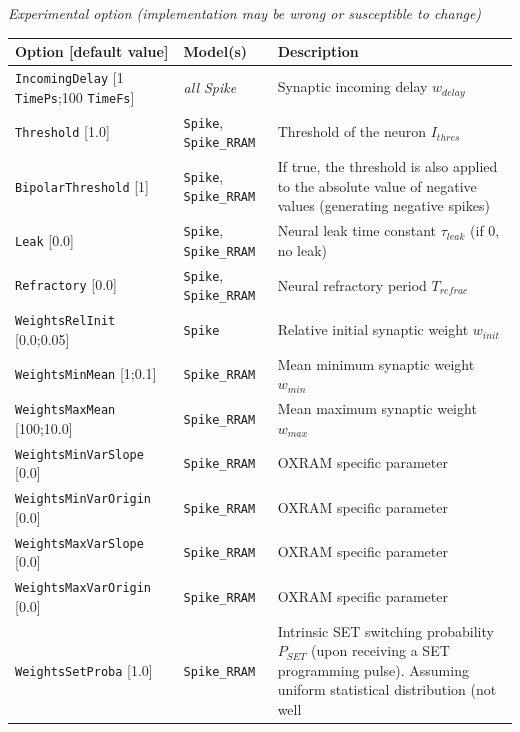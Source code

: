 \documentclass[a4paper,11pt,oneside]{article}
\begin{document}
\begin{flushleft}
\emph{Experimental option (implementation may be wrong or susceptible
to change)}
\end{flushleft}
\begin{center}
 \begin{longtable}{| p{4cm} | p{3cm} | p{9cm} | }
 \hline
 Option [default value] & Model(s) & Description\\
 \hline\hline
  \lstinline!IncomingDelay! [1 \lstinline!TimePs!;100 \lstinline!TimeFs!]
  & \emph{all Spike} & Synaptic incoming delay $w_{delay}$ \\
  \lstinline!Threshold! [1.0] & \lstinline!Spike!, \lstinline!Spike_RRAM!
  & Threshold of the neuron $I_{thres}$ \\
  \lstinline!BipolarThreshold! [1] & \lstinline!Spike!, \lstinline!Spike_RRAM!
  & If true, the threshold is also applied to the absolute value of negative
  values (generating negative spikes) \\
  \lstinline!Leak! [0.0] & \lstinline!Spike!, \lstinline!Spike_RRAM!
  & Neural leak time constant $\tau_{leak}$ (if 0, no leak) \\
  \lstinline!Refractory! [0.0] & \lstinline!Spike!, \lstinline!Spike_RRAM!
  & Neural refractory period $T_{refrac}$ \\
  \lstinline!WeightsRelInit! [0.0;0.05] & \lstinline!Spike!
  & Relative initial synaptic weight $w_{init}$ \\
  \lstinline!WeightsMinMean! [1;0.1] & \lstinline!Spike_RRAM!
  & Mean minimum synaptic weight $w_{min}$ \\
  \lstinline!WeightsMaxMean! [100;10.0] & \lstinline!Spike_RRAM!
  & Mean maximum synaptic weight $w_{max}$ \\
  \lstinline!WeightsMinVarSlope! [0.0] & \lstinline!Spike_RRAM!
  & OXRAM specific parameter \\
  \lstinline!WeightsMinVarOrigin! [0.0] & \lstinline!Spike_RRAM!
  & OXRAM specific parameter \\
  \lstinline!WeightsMaxVarSlope! [0.0] & \lstinline!Spike_RRAM!
  & OXRAM specific parameter \\
  \lstinline!WeightsMaxVarOrigin! [0.0] & \lstinline!Spike_RRAM!
  & OXRAM specific parameter \\
  \lstinline!WeightsSetProba! [1.0] & \lstinline!Spike_RRAM!
  & Intrinsic SET switching probability $P_{SET}$ (upon receiving a SET
   programming pulse). Assuming uniform statistical distribution (not well

\end{longtable}
\end{center}
\end{document}
